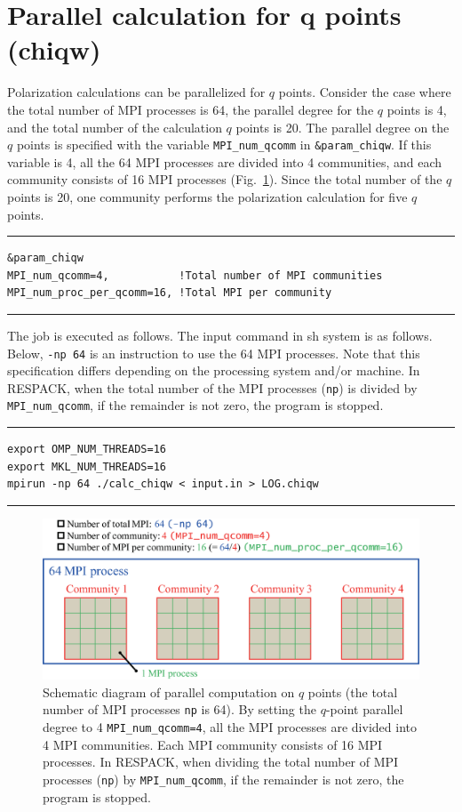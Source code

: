 \documentclass{article}
\begin{document}
\clearpage 

\section{\label{qcom}Parallel calculation for q points (chiqw)}
Polarization calculations can be parallelized for $q$ points. Consider the case where the total number of MPI processes is 64, the parallel degree for the $q$ points is 4, and the total number of the calculation $q$ points is 20. The parallel degree on the $q$ points is specified with the variable {\tt MPI\_num\_qcomm} in {\tt \&param\_chiqw}. If this variable is 4, all the 64 MPI processes are divided into 4 communities, and each community consists of 16 MPI processes (Fig.~\ref{qcommunity}). Since the total number of the $q$ points is 20, one community performs the polarization calculation for five $q$ points.
\vspace{3mm}\hrule
\begin{verbatim}
&param_chiqw 
MPI_num_qcomm=4,           !Total number of MPI communities
MPI_num_proc_per_qcomm=16, !Total MPI per community 
\end{verbatim}
\hrule\vspace{3mm}
The job is executed as follows. The input command in sh system is as follows. Below, {\tt -np 64} is an instruction to use the 64 MPI processes. Note that this specification differs depending on the processing system and/or machine. In RESPACK, when the total number of the MPI processes ({\tt np}) is divided by {\tt MPI\_num\_qcomm}, if the remainder is not zero, the program is stopped.
\vspace{3mm}\hrule
\begin{verbatim}
export OMP_NUM_THREADS=16
export MKL_NUM_THREADS=16
mpirun -np 64 ./calc_chiqw < input.in > LOG.chiqw  
\end{verbatim}
\hrule\vspace{3mm}
\begin{figure}[H] 
\centering
\includegraphics[width=14cm]{q-community.eps}
\caption{Schematic diagram of parallel computation on $q$ points (the total number of MPI processes {\tt np} is 64). By setting the $q$-point parallel degree to 4 {\tt MPI\_num\_qcomm=4}, all the MPI processes are divided into 4 MPI communities. Each MPI community consists of 16 MPI processes. In RESPACK, when dividing the total number of MPI processes ({\tt np}) by {\tt MPI\_num\_qcomm}, if the remainder is not zero, the program is stopped.}
\label{qcommunity}
\end{figure}
\end{document}
